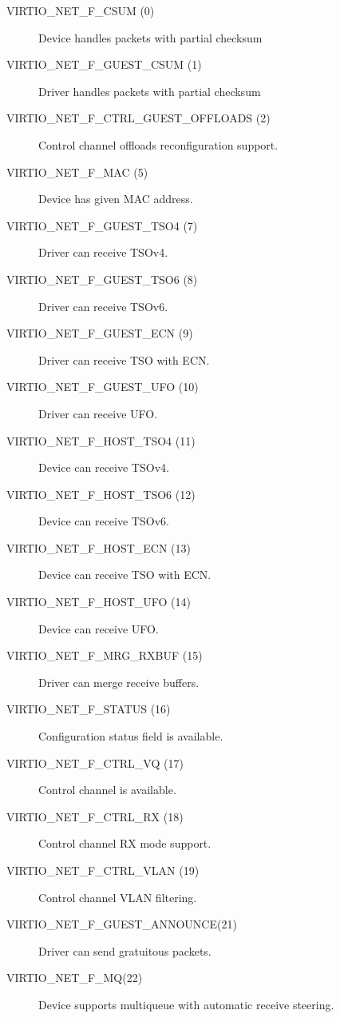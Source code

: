 \begin{description}
\item[VIRTIO_NET_F_CSUM (0)] Device handles packets with partial checksum

\item[VIRTIO_NET_F_GUEST_CSUM (1)] Driver handles packets with partial checksum

\item[VIRTIO_NET_F_CTRL_GUEST_OFFLOADS (2)] Control channel offloads
        reconfiguration support.

\item[VIRTIO_NET_F_MAC (5)] Device has given MAC address.

\item[VIRTIO_NET_F_GUEST_TSO4 (7)] Driver can receive TSOv4.

\item[VIRTIO_NET_F_GUEST_TSO6 (8)] Driver can receive TSOv6.

\item[VIRTIO_NET_F_GUEST_ECN (9)] Driver can receive TSO with ECN.

\item[VIRTIO_NET_F_GUEST_UFO (10)] Driver can receive UFO.

\item[VIRTIO_NET_F_HOST_TSO4 (11)] Device can receive TSOv4.

\item[VIRTIO_NET_F_HOST_TSO6 (12)] Device can receive TSOv6.

\item[VIRTIO_NET_F_HOST_ECN (13)] Device can receive TSO with ECN.

\item[VIRTIO_NET_F_HOST_UFO (14)] Device can receive UFO.

\item[VIRTIO_NET_F_MRG_RXBUF (15)] Driver can merge receive buffers.

\item[VIRTIO_NET_F_STATUS (16)] Configuration status field is
    available.

\item[VIRTIO_NET_F_CTRL_VQ (17)] Control channel is available.

\item[VIRTIO_NET_F_CTRL_RX (18)] Control channel RX mode support.

\item[VIRTIO_NET_F_CTRL_VLAN (19)] Control channel VLAN filtering.

\item[VIRTIO_NET_F_GUEST_ANNOUNCE(21)] Driver can send gratuitous
    packets.

\item[VIRTIO_NET_F_MQ(22)] Device supports multiqueue with automatic
    receive steering.

\end{description}

